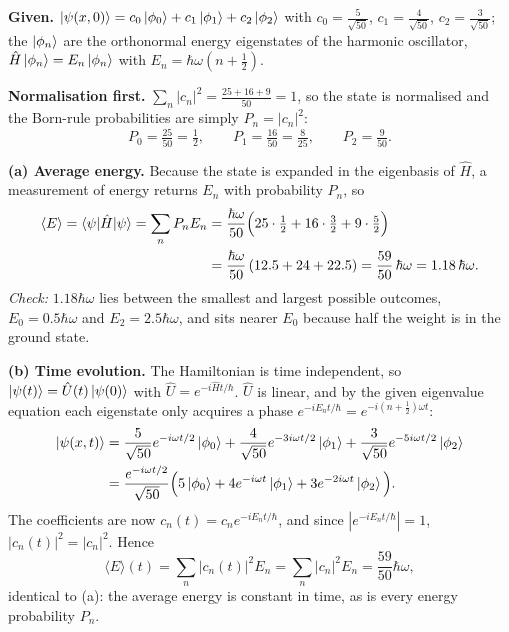 \documentclass[12pt]{article}
\newif\ifsolutions
\begin{document}
\ifsolutions
\begin{solutionbox}
\textbf{Given.} $\ket{\psi(x,0)}=c_0\ket{\phi_0}+c_1\ket{\phi_1}+c_2\ket{\phi_2}$ with $c_0=\frac{5}{\sqrt{50}}$, $c_1=\frac{4}{\sqrt{50}}$, $c_2=\frac{3}{\sqrt{50}}$; the $\ket{\phi_n}$ are the orthonormal energy eigenstates of the harmonic oscillator, $\hat H\ket{\phi_n}=E_n\ket{\phi_n}$ with $E_n=\hbar\omega(n+\tfrac12)$.

\textbf{Normalisation first.} $\sum_n|c_n|^2=\frac{25+16+9}{50}=1$, so the state is normalised and the Born-rule probabilities are simply $P_n=|c_n|^2$:
\[
P_0=\tfrac{25}{50}=\tfrac12,\qquad P_1=\tfrac{16}{50}=\tfrac{8}{25},\qquad P_2=\tfrac{9}{50}.
\]

\textbf{(a) Average energy.} Because the state is expanded in the eigenbasis of $\hat H$, a measurement of energy returns $E_n$ with probability $P_n$, so
\begin{align*}
\langle E\rangle=\braket{\psi|\hat H|\psi}=\sum_nP_nE_n
&=\frac{\hbar\omega}{50}\Big(25\cdot\tfrac12+16\cdot\tfrac32+9\cdot\tfrac52\Big)\\
&=\frac{\hbar\omega}{50}\,(12.5+24+22.5)=\frac{59}{50}\,\hbar\omega=1.18\,\hbar\omega .
\end{align*}
\emph{Check:} $1.18\hbar\omega$ lies between the smallest and largest possible outcomes, $E_0=0.5\hbar\omega$ and $E_2=2.5\hbar\omega$, and sits nearer $E_0$ because half the weight is in the ground state.

\textbf{(b) Time evolution.} The Hamiltonian is time independent, so $\ket{\psi(t)}=\hat U(t)\ket{\psi(0)}$ with $\hat U=e^{-i\hat Ht/\hbar}$. $\hat U$ is linear, and by the given eigenvalue equation each eigenstate only acquires a phase $e^{-iE_nt/\hbar}=e^{-i(n+\frac12)\omega t}$:
\begin{align*}
\ket{\psi(x,t)}
&=\frac{5}{\sqrt{50}}e^{-i\omega t/2}\ket{\phi_0}+\frac{4}{\sqrt{50}}e^{-3i\omega t/2}\ket{\phi_1}+\frac{3}{\sqrt{50}}e^{-5i\omega t/2}\ket{\phi_2}\\
&=\frac{e^{-i\omega t/2}}{\sqrt{50}}\Big(5\ket{\phi_0}+4e^{-i\omega t}\ket{\phi_1}+3e^{-2i\omega t}\ket{\phi_2}\Big).
\end{align*}
The coefficients are now $c_n(t)=c_ne^{-iE_nt/\hbar}$, and since $|e^{-iE_nt/\hbar}|=1$, $|c_n(t)|^2=|c_n|^2$. Hence
\[
\langle E\rangle(t)=\sum_n|c_n(t)|^2E_n=\sum_n|c_n|^2E_n=\frac{59}{50}\hbar\omega,
\]
identical to (a): the average energy is constant in time, as is every energy probability $P_n$.


\end{solutionbox}
\end{document}
